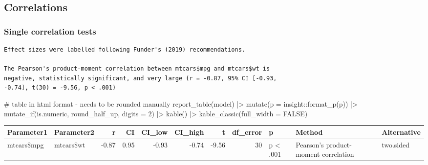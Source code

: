 \documentclass[
  letterpaper,
  DIV=11,
  numbers=noendperiod]{scrreprt}
\newenvironment{Shaded}{\begin{snugshade}}{\end{snugshade}}
\newcommand{\AttributeTok}[1]{\textcolor[rgb]{0.40,0.45,0.13}{#1}}
\newcommand{\CommentTok}[1]{\textcolor[rgb]{0.37,0.37,0.37}{#1}}
\newcommand{\ConstantTok}[1]{\textcolor[rgb]{0.56,0.35,0.01}{#1}}
\newcommand{\DecValTok}[1]{\textcolor[rgb]{0.68,0.00,0.00}{#1}}
\newcommand{\FunctionTok}[1]{\textcolor[rgb]{0.28,0.35,0.67}{#1}}
\newcommand{\NormalTok}[1]{\textcolor[rgb]{0.00,0.23,0.31}{#1}}
\newcommand{\OtherTok}[1]{\textcolor[rgb]{0.00,0.23,0.31}{#1}}
\newcommand{\SpecialCharTok}[1]{\textcolor[rgb]{0.37,0.37,0.37}{#1}}
\begin{document}
\subsection{Correlations}\label{correlations}

\subsubsection{Single correlation tests}\label{single-correlation-tests}

\begin{Shaded}
\end{Shaded}

\begin{verbatim}
Effect sizes were labelled following Funder's (2019) recommendations.

The Pearson's product-moment correlation between mtcars$mpg and mtcars$wt is
negative, statistically significant, and very large (r = -0.87, 95% CI [-0.93,
-0.74], t(30) = -9.56, p < .001)
\end{verbatim}

\begin{Shaded}
\begin{Highlighting}[]
\CommentTok{\# table in html format {-} needs to be rounded manually}
\FunctionTok{report\_table}\NormalTok{(model) }\SpecialCharTok{|\textgreater{}}
  \FunctionTok{mutate}\NormalTok{(}\AttributeTok{p =}\NormalTok{ insight}\SpecialCharTok{::}\FunctionTok{format\_p}\NormalTok{(p)) }\SpecialCharTok{|\textgreater{}}
  \FunctionTok{mutate\_if}\NormalTok{(is.numeric, round\_half\_up, }\AttributeTok{digits =} \DecValTok{2}\NormalTok{) }\SpecialCharTok{|\textgreater{}}
  \FunctionTok{kable}\NormalTok{() }\SpecialCharTok{|\textgreater{}}
  \FunctionTok{kable\_classic}\NormalTok{(}\AttributeTok{full\_width =} \ConstantTok{FALSE}\NormalTok{)}
\end{Highlighting}
\end{Shaded}

\begin{longtable*}[t]{llrrrrrrlll}
\toprule
Parameter1 & Parameter2 & r & CI & CI\_low & CI\_high & t & df\_error & p & Method & Alternative\\
\midrule
mtcars\$mpg & mtcars\$wt & -0.87 & 0.95 & -0.93 & -0.74 & -9.56 & 30 & p < .001 & Pearson's product-moment correlation & two.sided\\
\bottomrule
\end{longtable*}
\end{document}
